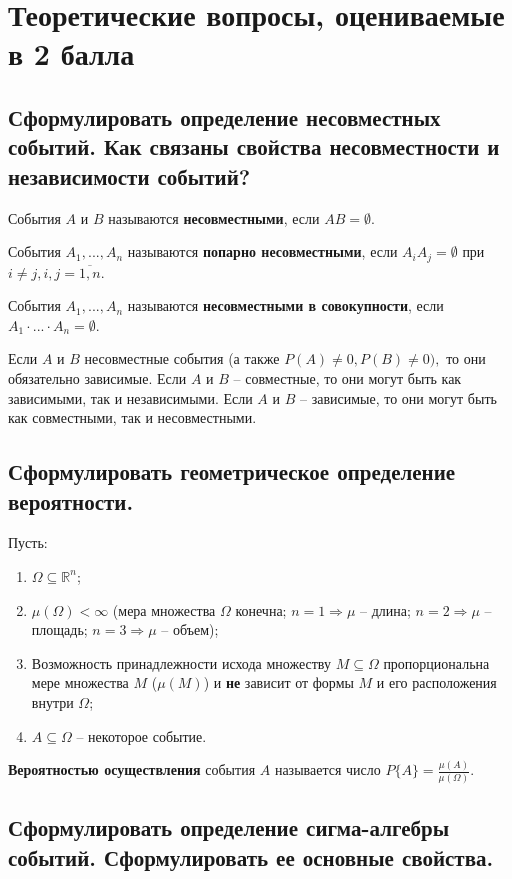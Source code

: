\chapter{Теоретические вопросы, оцениваемые в 2 балла}

\section{Сформулировать определение несовместных событий. Как связаны свойства несовместности и независимости событий?}

События $A$ и $B$ называются \textbf{несовместными}, если $AB = \emptyset$.

События $A_1, ..., A_n$ называются \textbf{попарно несовместными}, если $A_iA_j = \emptyset$ при $i \neq j, i, j = \overline{1, n}$.

События $A_1, ..., A_n$ называются \textbf{несовместными в совокупности}, если $A_1 \cdot ... \cdot A_n = \emptyset$.

Если $A$ и $B$ несовместные события (а также $P(A) \neq 0, P(B) \neq 0),$ то они обязательно зависимые. Если $A$ и $B$ -- совместные, то они могут быть как зависимыми, так и независимыми. Если $A$ и $B$ – зависимые, то они могут быть как совместными, так и несовместными.

\section{Сформулировать геометрическое определение вероятности.}

Пусть:
\begin{enumerate}
	\item $\Omega \subseteq \mathbb{R}^n$;
	\item $\mu(\Omega) < \infty$ (мера множества $\Omega$ конечна; $n = 1 \Rightarrow \mu$ -- длина; $n = 2 \Rightarrow \mu$ -- площадь; $n = 3 \Rightarrow \mu$ -- объем);
	\item Возможность принадлежности исхода множеству $M \subseteq \Omega$ пропорциональна мере множества $M$ ($\mu(M)$) и \textbf{не} зависит от формы $M$ и его расположения внутри $\Omega$;
	\item $A \subseteq \Omega$ -- некоторое событие.
\end{enumerate}

\textbf{Вероятностью осуществления} события $A$ называется число $P\{A\} = \frac{\mu(A)}{\mu(\Omega)}.$

\section{Сформулировать определение сигма-алгебры событий. Сформулировать ее основные свойства.}

